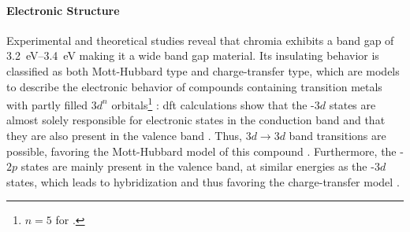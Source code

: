 \paragraph{Electronic Structure}
Experimental and theoretical studies reveal that chromia exhibits a band gap of \qtyrange{3.2}{3.4}{\eV}
    \cite{mi2018,robbert1998,lebreau2014,arca2013}
making it a wide band gap material.
Its insulating behavior \cite{arca2013} is classified as both Mott-Hubbard type and charge-transfer type, which are models to describe the electronic behavior of compounds containing transition metals with partly filled $3d^n$ orbitals\footnote{$n=5$ for .}
    \cite{catti1996,mi2018,lebreau2014}:
\gls{dft} calculations show that the -$3d$ states are almost solely responsible for electronic states in the conduction band and that they are also present in the valence band
    \cite{mi2018,lebreau2014}.
Thus, $3d\longrightarrow 3d$ band transitions are possible, favoring the Mott-Hubbard model of this compound
    \cite{lebreau2014}.
Furthermore, the -$2p$ states are mainly present in the valence band, at similar energies as the -$3d$ states, which leads to hybridization and thus favoring the charge-transfer model
    \cite{lebreau2014}.

